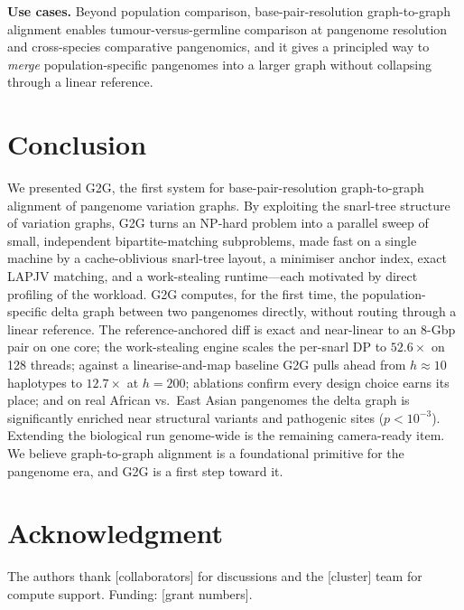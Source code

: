 \documentclass[conference]{IEEEtran}
\theoremstyle{plain}
\theoremstyle{definition}
\newcommand{\PH}[1]{\textcolor{red!75!black}{#1}}
\begin{document}
\textbf{Use cases.} Beyond population comparison, base-pair-resolution
graph-to-graph alignment enables tumour-versus-germline comparison at pangenome
resolution and cross-species comparative pangenomics, and it gives a principled
way to \emph{merge} population-specific pangenomes into a larger graph without
collapsing through a linear reference.

\section{Conclusion}
\label{sec:conclusion}
We presented \textsc{G2G}, the first system for base-pair-resolution
graph-to-graph alignment of pangenome variation graphs. By exploiting the
snarl-tree structure of variation graphs, \textsc{G2G} turns an NP-hard problem
into a parallel sweep of small, independent bipartite-matching subproblems, made
fast on a single machine by a cache-oblivious snarl-tree layout, a minimiser
anchor index, exact LAPJV matching, and a work-stealing runtime---each motivated
by direct profiling of the workload. \textsc{G2G} computes, for the first time,
the population-specific delta graph between two pangenomes directly, without
routing through a linear reference. The reference-anchored diff is exact and
near-linear to an 8-Gbp pair on one core; the work-stealing engine scales the
per-snarl DP to $52.6\times$ on 128 threads; against a linearise-and-map baseline
\textsc{G2G} pulls ahead from $h{\approx}10$ haplotypes to $12.7\times$ at
$h{=}200$; ablations confirm every design choice earns its place; and on real
African vs.\ East Asian pangenomes the delta graph is significantly enriched near
structural variants and pathogenic sites ($p<10^{-3}$). \PH{Extending the
biological run genome-wide is the remaining camera-ready item.} We believe
graph-to-graph alignment is a foundational primitive for the pangenome era, and
\textsc{G2G} is a first step toward it.

\section*{Acknowledgment}
The authors thank \PH{[collaborators]} for discussions and the \PH{[cluster]}
team for compute support. \PH{Funding: [grant numbers].}

\balance


\end{document}
